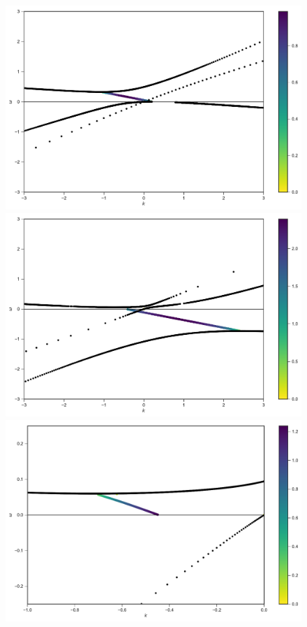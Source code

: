 \documentclass[%
preprint,
 amsmath,amssymb,
 aps,
 prd
]{revtex4-1}
\begin{document}
\begin{figure}[!htb]
\endminipage
\newline
{}
  \includegraphics[width=\linewidth]{assets/spectDB3WC4DRDBMAAPlt.pdf}
\endminipage\hfill
{}
  \includegraphics[width=\linewidth]{assets/spectDB3WC4DRDBMZApPlt.pdf}
\endminipage\hfill
{}
  \includegraphics[width=\linewidth]{assets/spectDB3WC4DRDBMZAmPlt.pdf}

\end{figure}
\end{document}
